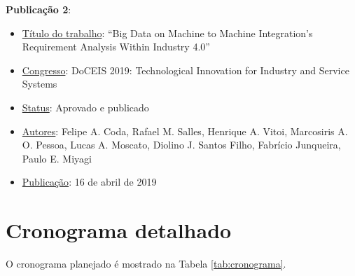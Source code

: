 \documentclass[
	12pt,				%
	oneside,			%
	a4paper,			%
	english,			%
	brazil				%
]{abntex2}
\begin{document}
	\textbf{Publicação 2}:
	\begin{itemize}
		\item \underline{Título do trabalho}: “Big Data on Machine to Machine Integration's Requirement Analysis Within Industry 4.0”
		\item \underline{Congresso}: DoCEIS 2019: Technological Innovation for Industry and Service Systems
		\item \underline{Status}: Aprovado e publicado
		\item \underline{Autores}:  Felipe A. Coda, Rafael M. Salles, Henrique A. Vitoi, Marcosiris A. O. Pessoa, Lucas A. Moscato, Diolino J. Santos Filho, Fabrício Junqueira, Paulo E. Miyagi
		\item \underline{Publicação}: 16 de abril de 2019
	\end{itemize}




\chapter{Cronograma detalhado}

	O cronograma planejado é mostrado na Tabela \ref{tab:cronograma}.
	
\end{document}
